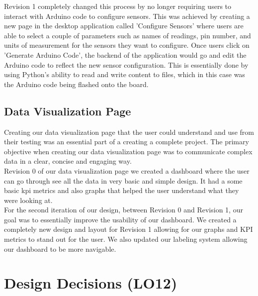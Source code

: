 \documentclass[12pt]{article}
\begin{document}
Revision 1 completely changed this process by no longer requiring users to interact with Arduino code to configure sensors. This was achieved by creating a new
page in the desktop application called 'Configure Sensors' where users are able to select a couple of parameters such as names of readings, pin number, and units of
measurement for the sensors they want to configure. Once users click on 'Generate Arduino Code', the backend of the application would go and edit the Arduino
code to reflect the new sensor configuration. This is essentially done by using Python's ability to read and write content to files, which in this case was the
Arduino code being flashed onto the board.

\subsection{Data Visualization Page}

Creating our data visualization page that the user could understand and use from their testing was an essential part of a creating a complete project. The primary objective when creating our data visualization page was to communicate complex data in a clear, concise and engaging way. \\

Revision 0 of our data visualization page we created a dashboard where the user can go through see all the data in very basic and simple design. It had a some basic kpi metrics and also graphs that helped the user understand what they were looking at.\\

For the second iteration of our design, between Revision 0 and Revision 1, our goal was to essentially improve the usability of our dashboard. We created a completely new design and layout for Revision 1 allowing for our graphs and KPI metrics to stand out for the user. We also updated our labeling system allowing our dashboard to be more navigable.\\

\section{Design Decisions (LO12)}

\end{document}

